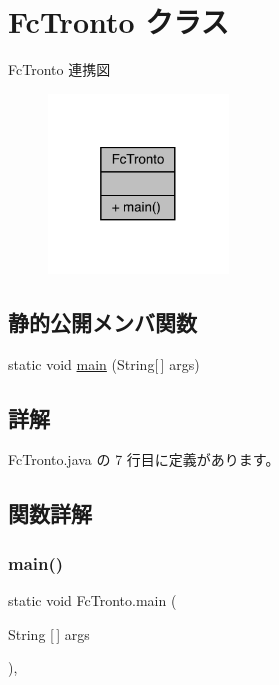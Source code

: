 \hypertarget{class_fc_tronto}{}\section{Fc\+Tronto クラス}
\label{class_fc_tronto}


Fc\+Tronto 連携図\nopagebreak
\begin{figure}[H]
\begin{center}
\leavevmode
\includegraphics[width=136pt]{d4/df1/class_fc_tronto__coll__graph}
\end{center}
\end{figure}
\subsection*{静的公開メンバ関数}
\begin{DoxyCompactItemize}
\item 
static void \mbox{\hyperlink{class_fc_tronto_a3e0328e996d4755d3624e9217c5848dc}{main}} (String\mbox{[}$\,$\mbox{]} args)
\end{DoxyCompactItemize}


\subsection{詳解}


 Fc\+Tronto.\+java の 7 行目に定義があります。



\subsection{関数詳解}
\mbox{\label{class_fc_tronto_a3e0328e996d4755d3624e9217c5848dc}} 
\subsubsection{\texorpdfstring{main()}{main()}}
{\footnotesize\ttfamily static void Fc\+Tronto.\+main (\begin{DoxyParamCaption}\item[{String \mbox{[}$\,$\mbox{]}}]{args }\end{DoxyParamCaption})\hspace{0.3cm}{\ttfamily [inline]}, {\ttfamily [static]}}




